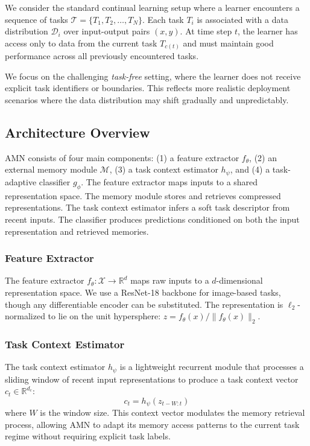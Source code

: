 \documentclass[11pt]{article}
\begin{document}
We consider the standard continual learning setup where a learner encounters a sequence of tasks $\mathcal{T} = \{T_1, T_2, \ldots, T_N\}$. Each task $T_i$ is associated with a data distribution $\mathcal{D}_i$ over input-output pairs $(x, y)$. At time step $t$, the learner has access only to data from the current task $T_{c(t)}$ and must maintain good performance across all previously encountered tasks.

We focus on the challenging \emph{task-free} setting, where the learner does not receive explicit task identifiers or boundaries. This reflects more realistic deployment scenarios where the data distribution may shift gradually and unpredictably.

\subsection{Architecture Overview}

AMN consists of four main components: (1) a feature extractor $f_\theta$, (2) an external memory module $\mathcal{M}$, (3) a task context estimator $h_\psi$, and (4) a task-adaptive classifier $g_\phi$. The feature extractor maps inputs to a shared representation space. The memory module stores and retrieves compressed representations. The task context estimator infers a soft task descriptor from recent inputs. The classifier produces predictions conditioned on both the input representation and retrieved memories.

\subsubsection{Feature Extractor}

The feature extractor $f_\theta: \mathcal{X} \rightarrow \mathbb{R}^d$ maps raw inputs to a $d$-dimensional representation space. We use a ResNet-18 backbone \citep{he2016deep} for image-based tasks, though any differentiable encoder can be substituted. The representation is $\ell_2$-normalized to lie on the unit hypersphere: $z = f_\theta(x) / \|f_\theta(x)\|_2$.

\subsubsection{Task Context Estimator}

The task context estimator $h_\psi$ is a lightweight recurrent module that processes a sliding window of recent input representations to produce a task context vector $c_t \in \mathbb{R}^{d_c}$:
\begin{equation}
    c_t = h_\psi(z_{t-W:t})
\end{equation}
where $W$ is the window size. This context vector modulates the memory retrieval process, allowing AMN to adapt its memory access patterns to the current task regime without requiring explicit task labels.
\end{document}
